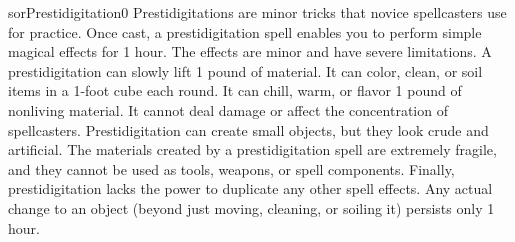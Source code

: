 \begin{spellcard}{sor}{Prestidigitation}{0}
  \spellcardqr{\urlgerman}
  Prestidigitations are minor tricks that novice spellcasters use for practice.
  Once cast, a prestidigitation spell enables you to perform simple magical effects for 1 hour.
  The effects are minor and have severe limitations.
  A prestidigitation can slowly lift 1 pound of material.
  It can color, clean, or soil items in a 1-foot cube each round.
  It can chill, warm, or flavor 1 pound of nonliving material.
  It cannot deal damage or affect the concentration of spellcasters.
  Prestidigitation can create small objects, but they look crude and artificial.
  The materials created by a prestidigitation spell are extremely fragile,
  and they cannot be used as tools, weapons, or spell components.
  Finally, prestidigitation lacks the power to duplicate any other spell effects.
  Any actual change to an object (beyond just moving, cleaning, or soiling it) persists only 1 hour.

\end{spellcard}
